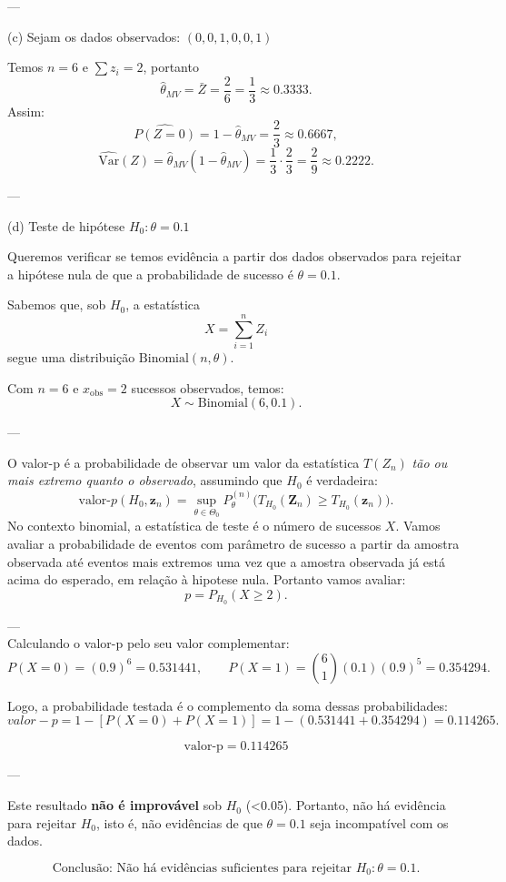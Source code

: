 ---

(c) Sejam os dados observados: \( (0, 0, 1, 0, 0, 1) \)

Temos \( n = 6 \) e \( \sum z_i = 2 \), portanto
\[
\hat{\theta}_{MV} = \bar{Z} = \frac{2}{6} = \frac{1}{3} \approx 0.3333.
\]
Assim:
\[
\widehat{P(Z=0)} = 1 - \hat{\theta}_{MV} = \frac{2}{3} \approx 0.6667,
\]
\[
\widehat{\mathrm{Var}}(Z) = \hat{\theta}_{MV}(1 - \hat{\theta}_{MV})
= \frac{1}{3} \cdot \frac{2}{3} = \frac{2}{9} \approx 0.2222.
\]

---

(d) Teste de hipótese \( H_0: \theta = 0.1 \)

Queremos verificar se temos evidência a partir dos dados observados para rejeitar a hipótese nula 
de que a probabilidade de sucesso é $\theta = 0.1$.

Sabemos que, sob $H_0$, a estatística
\[
X = \sum_{i=1}^{n} Z_i
\]
segue uma distribuição $\text{Binomial}(n, \theta)$.

Com $n = 6$ e $x_{\text{obs}} = 2$ sucessos observados, temos:
\[
X \sim \text{Binomial}(6, 0.1).
\]

---
 
O valor-p é a probabilidade de observar um valor da estatística $T(Z_n)$ 
\textit{tão ou mais extremo quanto o observado}, assumindo que $H_0$ é verdadeira:
\[
\boxed{
\text{valor-}p(H_0, \mathbf{z}_n)
= \sup_{\theta \in \Theta_0}
P^{(n)}_{\theta}\!\big(
T_{H_0}(\mathbf{Z}_n)
\ge
T_{H_0}(\mathbf{z}_n)
\big).
}
\]
No contexto binomial, a estatística de teste é o número de sucessos $X$. Vamos avaliar a probabilidade de eventos
com parâmetro de sucesso a partir da amostra observada até eventos mais extremos uma vez que a amostra observada já está acima do esperado, em relação à hipotese nula. Portanto vamos avaliar:
\[
p = P_{H_0}(X \ge 2).
\]

---
\\
Calculando o valor-p pelo seu valor complementar:
\[
P(X=0) = (0.9)^6 = 0.531441, \qquad 
P(X=1) = \binom{6}{1}(0.1)(0.9)^5 = 0.354294.
\]

Logo, a probabilidade testada é o complemento da soma dessas probabilidades:
\[
valor-p = 1 - [P(X=0) + P(X=1)] = 1 - (0.531441 + 0.354294) = 0.114265.
\]

\[
\boxed{\text{valor-p} = 0.114265}
\]

---

Este resultado \textbf{não é improvável} sob $H_0$ (<0.05).  
Portanto, não há evidência para rejeitar  $H_0$, isto é, não evidências de que $\theta = 0.1$ seja incompatível com os dados.

\[
\boxed{\text{Conclusão: Não há evidências suficientes para rejeitar } H_0 : \theta = 0.1.}
\]
